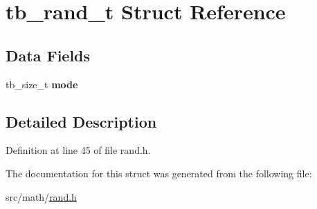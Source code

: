 \hypertarget{structtb__rand__t}{\section{tb\-\_\-rand\-\_\-t Struct Reference}
\label{structtb__rand__t}
}
\subsection*{Data Fields}
\begin{DoxyCompactItemize}
\item 
\hypertarget{structtb__rand__t_aef5869c8c5346c6d648c060f6367e093}{tb\-\_\-size\-\_\-t {\bfseries mode}}\label{structtb__rand__t_aef5869c8c5346c6d648c060f6367e093}

\end{DoxyCompactItemize}


\subsection{Detailed Description}


Definition at line 45 of file rand.\-h.



The documentation for this struct was generated from the following file\-:\begin{DoxyCompactItemize}
\item 
src/math/\hyperlink{rand_8h}{rand.\-h}\end{DoxyCompactItemize}
